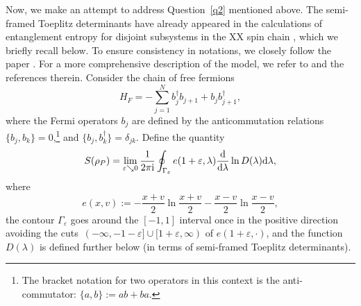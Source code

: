 \documentclass[pdftex]{sigma}
\numberwithin{equation}{section}
\newcommand{\la}{\lambda}
\begin{document}
	Now, we make an attempt to address Question~\ref{q2} mentioned above. The semi-framed Toeplitz determinants have already appeared in the calculations of entanglement entropy for disjoint subsystems in the XX spin chain \cite{BGIKMMV,JK}, which we briefly recall below. To ensure consistency in notations, we closely follow the paper \cite{BGIKMMV}. For a more comprehensive description of the model, we refer to \cite{BGIKMMV,JK} and the references therein. Consider the chain of free fermions%
\begin{equation}\label{FFchain}
		H_F = -\sum_{j=1}^{N}b_j^\dagger b_{j+1} + b_jb_{j+1}^\dagger,
\end{equation}
	where the Fermi operators $b_j$ are defined by the anticommutation relations $\{b_j,b_k\} = 0$,\footnote{The bracket notation for two operators in this context is the anti-commutator: $\{a,b\}:=ab+ba$.} and $\big\{b_j,b_k^\dagger\big\}= \delta_{jk}$. Define the quantity
	\begin{equation}\label{eq:entr-int}
		S(\rho_P) = \lim_{\varepsilon\searrow 0} \frac{1}{2\pi {\rm i}} \oint_{\Gamma_\varepsilon} e(1+\varepsilon,\lambda)\frac{\rm d}{{\rm d}\lambda}\ln D(\lambda) {\rm d}\lambda,
	\end{equation}
	where
	\begin{equation*}
		 e(x,v) := -\frac{x+v}{2}\ln\frac{x+v}{2}-\frac{x-v}{2}\ln\frac{x-v}{2},
	\end{equation*}
	the contour $\Gamma_\varepsilon$ goes around the $[-1,1]$ interval once in the positive direction avoiding the cuts~${(-\infty,-1-\varepsilon]\cup[1+\varepsilon,\infty)}$ of $ e(1+\varepsilon,\cdot)$, and the function $D(\la)$ is defined further below (in terms of semi-framed Toeplitz determinants).
	
\end{document}
